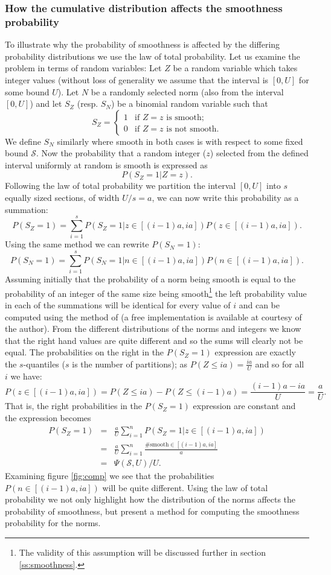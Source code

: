 \documentclass[a4paper, 10pt, envcountsect, runningheads]{lms}
\numberwithin{figure}{section}
\numberwithin{equation}{section}
\begin{document}
\subsubsection*{How the cumulative distribution affects the smoothness probability}
To illustrate why the probability of smoothness is affected by the differing probability distributions we use the law of total probability. Let us examine the problem in terms of random variables: Let $Z$ be a random variable which takes integer values (without loss of generality we assume that the interval is $[0,U]$ for some bound $U$). Let $N$ be a randomly selected norm (also from the interval $[0,U]$) and let $S_Z$ (resp. $S_N$) be a binomial random variable such that 
\begin{equation}
S_Z=\left\{\begin{array}{ll}
1 & \mbox{if }Z=z\mbox{ is smooth};\\
0 & \mbox{if }Z=z\mbox{ is not smooth}.
\end{array}\right.
\end{equation}
We define $S_N$ similarly where smooth in both cases is with respect to some fixed bound $\mathcal{S}$. Now the probability that a random integer ($z$) selected from the defined interval uniformly at random is smooth is expressed as $$P(S_Z=1| Z=z).$$ Following the law of total probability we partition the interval $[0,U]$ into $s$ equally sized sections, of width $U/s=a$, we can now write this probability as a summation: $$P(S_Z=1)=\sum_{i=1}^{s}P(S_Z=1| z\in[(i-1)a,ia])P(z\in[(i-1)a,ia]).$$ Using the same method we can rewrite $P(S_N=1)$: $$P(S_N=1)=\sum_{i=1}^{s}P(S_N=1| n\in[(i-1)a,ia])P(n\in[(i-1)a,ia]).$$
Assuming initially that the probability of a norm being smooth is equal to the probability of an integer of the same size being smooth\footnote{The validity of this assumption will be discussed further in section \ref{ss:smoothness}.} the left probability value in each of the summations will be identical for every value of $i$ and can be computed using the method of \cite{dan_psi_est} (a free implementation is available at \cite{dan_imp} courtesy of the author). From the different distributions of the norms and integers we know that the right hand values are quite different and so the sums will clearly not be equal. 
The probabilities on the right in the $P(S_Z=1)$ expression are exactly the $s$-quantiles ($s$ is the number of partitions); as $P(Z\leq ia)=\frac{ia}{U}$ and so for all $i$ we have: $$P(z\in[(i-1)a,ia])=P(Z\leq ia)-P(Z\leq (i-1)a)=\frac{(i-1)a-ia}{U}=\frac{a}{U}.$$ That is, the right probabilities in the $P(S_Z=1)$ expression are constant and the expression becomes 
\begin{eqnarray*}
P(S_Z=1)&=&\frac{a}{U}\sum_{i=1}^{n}P(S_Z=1| z\in[(i-1)a,ia])\\
&=&\frac{a}{U}\sum_{i=1}^{n}\frac{\#\mbox{smooth}\in[(i-1)a,ia]}{a}\\
&=&\Psi(\mathcal{S},U)/U.
\end{eqnarray*}
Examining figure \ref{fig:comp} we see that the probabilities $P(n\in[(i-1)a,ia])$ will be quite different. Using the law of total probability we not only highlight how the distribution of the norms affects the probability of smoothness, but present a method for computing the smoothness probability for the norms. 
\end{document}
